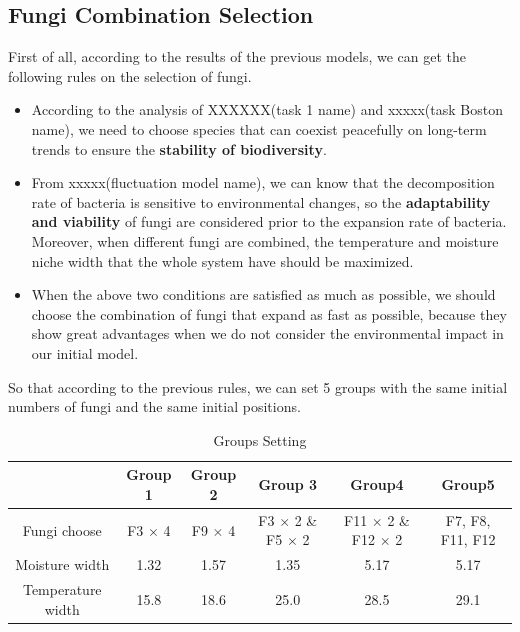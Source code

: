 \documentclass{mcmthesis}
\begin{document}
\subsection{Fungi Combination Selection}
\par First of all, according to the results of the previous models, we can get the following rules on the selection of fungi.
\begin{itemize}
	\item According to the analysis of XXXXXX(task 1 name) and xxxxx(task Boston name), we need to choose species that can coexist peacefully on long-term trends to ensure the \textbf{stability of biodiversity}.
	\item From xxxxx(fluctuation model name), we can know that the decomposition rate of bacteria is sensitive to environmental changes, so the \textbf{adaptability and viability} of fungi are considered prior to the expansion rate of bacteria. Moreover, when different fungi are combined, the temperature and moisture niche width that the whole system have should be maximized.
	\item When the above two conditions are satisfied as much as possible, we should choose the combination of fungi that expand as fast as possible, because they show great advantages when we do not consider the environmental impact in our initial model.	
\end{itemize}
\par So that according to the previous rules, we can set 5 groups with the same initial numbers of fungi and the same initial positions. 
\begin{table}[H]
	\centering
	\caption{Groups Setting}
	\begin{tabular}{|c|c|c|c|c|c|}
		\hline
		&Group 1 & Group 2 & Group 3 & Group4& Group5\\
		\hline 
		Fungi choose&F3 $\times$ 4 & F9 $\times$ 4 & F3 $\times$ 2 \& F5 $\times$ 2 &  F11 $\times$ 2 \& F12 $\times$ 2 & F7, F8, F11, F12\\
		\hline
		Moisture width &1.32&1.57&1.35&5.17&5.17 \\
		\hline
		Temperature width &15.8&18.6&25.0&28.5&29.1 \\
		\hline
	\end{tabular}
\end{table}
\end{document}
